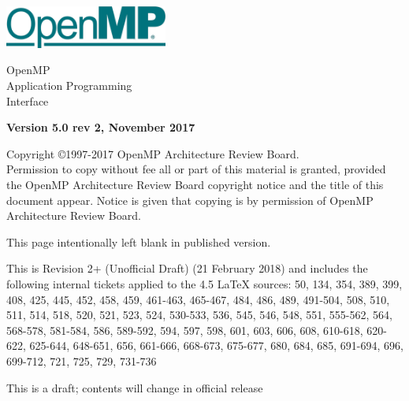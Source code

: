 
  \begin{titlepage}
    \begin{flushleft}
     \hspace{-6em} \includegraphics[width=0.4\textwidth]{openmp-logo.png}
    \end{flushleft}

    \begin{adjustwidth}{-0.75in}{0in}
    \begin{center}
      \Huge
      \textsf{OpenMP\\Application Programming\\Interface}

      \vspace{0.5in}\textsf{    }\vspace{-0.7in}
      \normalsize

      \vspace{1.0in}

      \textbf{Version 5.0 rev 2, November 2017}
    \end{center}
    \end{adjustwidth}

    \vspace{3.0in}

\begin{adjustwidth}{0pt}{1em}\setlength{\parskip}{0.25\baselineskip}%
Copyright \copyright 1997-2017 OpenMP Architecture Review Board.\\
Permission to copy without fee all or part of this material is granted,
provided the OpenMP Architecture Review Board copyright notice and
the title of this document appear. Notice is given that copying is by
permission of OpenMP Architecture Review Board.\end{adjustwidth}

  \end{titlepage}


\clearpage
\thispagestyle{empty}
\phantom{a}
This page intentionally left blank in published version.

This is Revision 2+ (Unofficial Draft) (21 February 2018) and
includes the following internal tickets applied to the 4.5 LaTeX sources:
50, 134, 354, 389, 399, 408, 425, 445, 452, 458, 459, 461-463, 465-467, 484, 
486, 489, 491-504, 508, 510, 511, 514, 518, 520, 521, 523, 524, 530-533, 
536, 545, 546, 548, 551, 555-562, 564, 568-578, 581-584, 586, 589-592, 
594, 597, 598, 601, 603, 606, 608, 610-618, 620-622, 625-644, 648-651, 
656, 661-666, 668-673, 675-677, 680, 684, 685, 691-694, 696, 699-712, 
721, 725, 729, 731-736

This is a draft; contents will change in official release

\vfill

